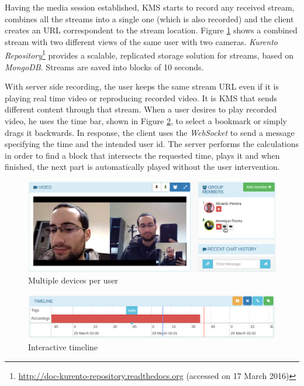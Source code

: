 \documentclass[10pt,conference]{IEEEtran}
\begin{document}
Having the media session established, \gls{KMS} starts to record any received stream, combines all the streams into a single one (which is also recorded) and the client creates an \gls{URL} correspondent to the stream location.
Figure \ref{fig:devices} shows a combined stream with two different views of the same user with two cameras.
\emph{Kurento Repository}\footnote{\url{http://doc-kurento-repository.readthedocs.org} (accessed on 17 March 2016)} provides a scalable, replicated storage solution for streams, based on \emph{MongoDB}.
Streams are saved into blocks of 10 seconds.

With server side recording, the user keeps the same stream \gls{URL} even if it is playing real time video or reproducing recorded video. 
It is \gls{KMS} that sends different content through that stream.
When a user desires to play recorded video, he uses the time bar, shown in Figure \ref{fig:timeline}, to select a bookmark or simply drags it backwards.
In response, the client uses the \emph{WebSocket} to send a message specifying the time and the intended user id.
The server performs the calculations in order to find a block that intersects the requested time, plays it and when finished, the next part is automatically played without the user intervention.

	\begin{figure}
		\centering
		\includegraphics[width=\linewidth]{figures/devices2.png}
		\caption{Multiple devices per user}
		\label{fig:devices}
	\end{figure}

	\begin{figure}
		\centering
		\includegraphics[width=\linewidth]{figures/timeline.png}
		\caption{Interactive timeline}
		\label{fig:timeline}
	\end{figure}
\end{document}
